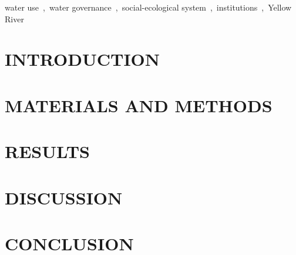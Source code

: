 \documentclass[preprint, 12pt]{elsarticle}
\begin{document}
\begin{frontmatter}


\begin{keyword}
     water use~\sep~water governance~\sep~social-ecological system~\sep~institutions~\sep~Yellow River
\end{keyword}

\end{frontmatter}

\section{INTRODUCTION}\label{sec:introduction}


\section{MATERIALS AND METHODS}\label{sec:methods}


\section{RESULTS}\label{sec:results}



\section{DISCUSSION}\label{sec:discussion}


\section{CONCLUSION}\label{sec:conclusion}



\end{document}
